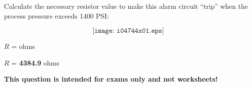 

Calculate the necessary resistor value to make this alarm circuit ``trip'' when the process pressure exceeds 1400 PSI:

$$\texttt{[image: i04744x01.eps]}$$

$R$ = \underbar{\hskip 50pt} ohms







$R$ = {\bf 4384.9} ohms







{\bf This question is intended for exams only and not worksheets!}




